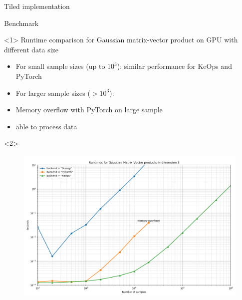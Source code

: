 \documentclass[12pt,aspectratio=1610]{beamer}
\begin{document}
\begin{frame}{Tiled implementation}

\end{frame}




\begin{frame}{Benchmark}

\hypertarget{benchmark}{}

\begin{onlyenv}<1>
Runtime comparison for Gaussian matrix-vector product on GPU with different data size\bigskip

\begin{itemize}
\small
\setitsep{1em}
\item For small sample sizes (up to $10^3$): similar performance for KeOps and PyTorch
\item For larger sample sizes ($>10^3$): 
\item Memory overflow with PyTorch on large sample
\item {} able to process data 
\end{itemize}
\btVFill

\hyperlink{implementation}{}
\end{onlyenv}

\begin{onlyenv}<2>
\begin{figure}
\centering
\includegraphics[width=0.85\linewidth]{./images/benchmark.png}
\end{figure}
\end{onlyenv}
\end{frame}
\end{document}
